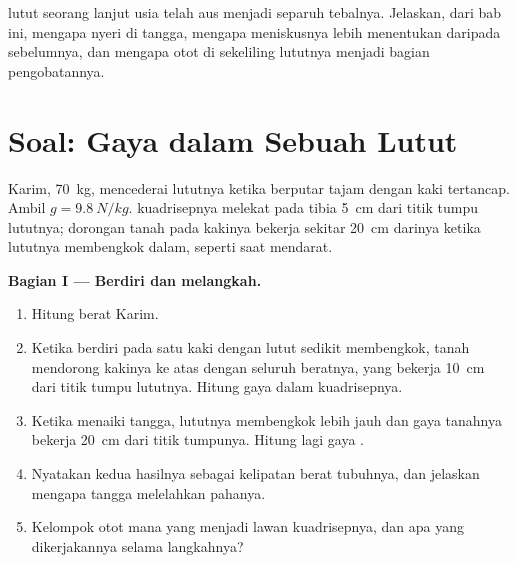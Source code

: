 \begin{exercise}[$\star\star\star$]\label{exo:g10:muscles-and-joints:15}
 lutut seorang lanjut usia telah aus menjadi separuh
tebalnya. Jelaskan, dari bab ini, mengapa  nyeri di tangga,
mengapa meniskusnya lebih menentukan daripada sebelumnya, dan mengapa
otot di sekeliling lututnya menjadi bagian pengobatannya.
\end{exercise}

\section{Soal: Gaya dalam Sebuah Lutut}

\begin{problem}
\label{pb:g10:muscles-and-joints:1}
Karim, \qty{70}{kg}, mencederai lututnya ketika berputar tajam dengan
kaki tertancap. Ambil $g = \qty{9.8}{N/kg}$.  kuadrisepnya
melekat pada tibia \qty{5}{cm} dari titik tumpu lututnya; dorongan
tanah pada kakinya bekerja sekitar \qty{20}{cm} darinya ketika lututnya
membengkok dalam, seperti saat mendarat.

\medskip
\noindent\textbf{Bagian I --- Berdiri dan melangkah.}
\begin{enumerate}
  \item Hitung berat Karim.
  \item Ketika berdiri pada satu kaki dengan lutut sedikit membengkok,
        tanah mendorong kakinya ke atas dengan seluruh beratnya, yang
        bekerja \qty{10}{cm} dari titik tumpu lututnya. Hitung gaya
        dalam  kuadrisepnya.
  \item Ketika menaiki tangga, lututnya membengkok lebih jauh dan gaya
        tanahnya bekerja \qty{20}{cm} dari titik tumpunya. Hitung lagi
        gaya .
  \item Nyatakan kedua hasilnya sebagai kelipatan berat tubuhnya, dan
        jelaskan mengapa tangga melelahkan pahanya.
  \item Kelompok otot mana yang menjadi lawan kuadrisepnya, dan apa
        yang dikerjakannya selama langkahnya?
\end{enumerate}


\end{problem}
